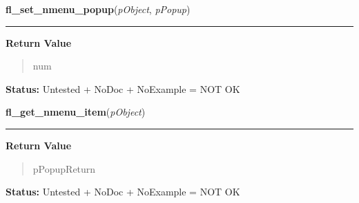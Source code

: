     \label{xformslib:library:fl_set_nmenu_popup}

    \vspace{0.5ex}

\hspace{.8\funcindent}\begin{boxedminipage}{\funcwidth}

    \raggedright \textbf{fl\_set\_nmenu\_popup}(\textit{pObject}, \textit{pPopup})

    \vspace{-1.5ex}

    \rule{\textwidth}{0.5\fboxrule}
\setlength{\parskip}{2ex}
\setlength{\parskip}{1ex}
      \textbf{Return Value}
    \vspace{-1ex}

      \begin{quote}
      num

      \end{quote}

\textbf{Status:} Untested + NoDoc + NoExample = NOT OK



    \end{boxedminipage}

    \label{xformslib:library:fl_get_nmenu_item}

    \vspace{0.5ex}

\hspace{.8\funcindent}\begin{boxedminipage}{\funcwidth}

    \raggedright \textbf{fl\_get\_nmenu\_item}(\textit{pObject})

    \vspace{-1.5ex}

    \rule{\textwidth}{0.5\fboxrule}
\setlength{\parskip}{2ex}
\setlength{\parskip}{1ex}
      \textbf{Return Value}
    \vspace{-1ex}

      \begin{quote}
      pPopupReturn

      \end{quote}

\textbf{Status:} Untested + NoDoc + NoExample = NOT OK



    \end{boxedminipage}


